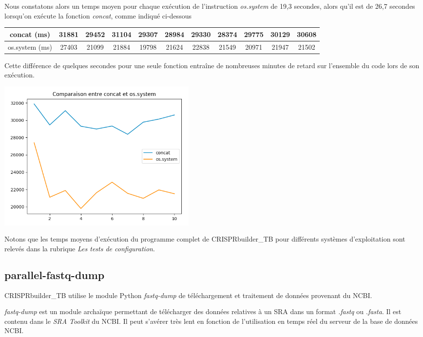 \documentclass[twoside,a4paper,11pt,frenchb,openany]{report}
\begin{document}
Nous constatons alors un temps moyen pour chaque exécution de l'instruction \textit{os.system} de 19,3 secondes, alors qu'il est de 26,7 secondes lorsqu'on exécute la fonction \textit{concat}, comme indiqué ci-dessous

\begin{tabular}{|c|c|c|c|c|c|c|c|c|c|c|}
\hline
concat (ms) & 31881 & 29452 & 31104 & 29307 & 28984 & 29330 & 28374 & 29775 & 30129 & 30608 \\
\hline
os.system (ms) & 27403 & 21099 & 21884 & 19798 & 21624 & 22838 & 21549 & 20971 & 21947 & 21502\\
\hline
\end{tabular}

Cette différence de quelques secondes pour une seule fonction entraîne de nombreuses minutes de retard sur l'ensemble du code lors de son exécution. 

\includegraphics[width=10cm]{comparaison_concat.png}

Notons que les temps moyens d'exécution du programme complet de CRISPRbuilder\_TB pour différents systèmes d'exploitation sont relevés dans la rubrique \textit{Les tests de configuration}.




\subsection{parallel-fastq-dump}

CRISPRbuilder\_TB utilise le module Python \textit{fastq-dump} de téléchargement et traitement de données provenant du NCBI.

\textit{fastq-dump} est un module archaïque permettant de télécharger des données relatives à un SRA dans un format \textit{.fastq} ou \textit{.fasta}. Il est contenu dans le \textit{SRA Toolkit} du NCBI. Il peut s'avérer très lent en fonction de l'utilisation en temps réel du serveur de la base de données NCBI. 
\end{document}
